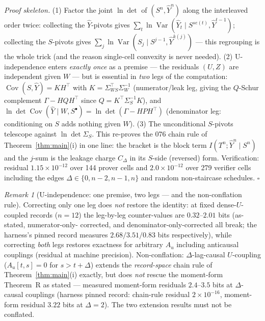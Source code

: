 \documentclass[11pt]{article}
\theoremstyle{definition}
\theoremstyle{remark}
\newtheorem{remark}{Remark}
\begin{document}
\noindent\emph{Proof skeleton.} (1) Factor the joint
$\ln\det$ of $(S^n,\hat Y^n)$ along the interleaved order twice:
collecting the $\hat Y$-pivots gives $\sum_t\ln\operatorname{Var}
(\hat Y_t\mid S^{se(t)},\hat Y^{t-1})$; collecting the $S$-pivots
gives $\sum_j\ln\operatorname{Var}(S_j\mid S^{j-1},\hat Y^{k(j)})$
--- this regrouping is the whole trick (and the reason single-cell
convexity is never needed). (2) U-independence enters \emph{exactly
once} as a premise --- the residuals $(U,Z)$ are independent given
$W$ --- but is essential in \emph{two} legs of the computation:
$\operatorname{Cov}(S,\hat Y)=KH^{\!\top}$ with
$K=\Sigma_{WS}^{\!\top}\Sigma_W^{-1}$ (numerator/leak leg, giving the
$Q$-Schur complement $\Gamma-HQH^{\!\top}$ since
$Q=K^{\!\top}\Sigma_S^{-1}K$), and
$\ln\det\operatorname{Cov}(\hat Y\mid W,S^{\bullet})
=\ln\det(\Gamma-HPH^{\!\top})$ (denominator leg: conditioning on $S$
adds nothing given $W$). (3) The unconditional $S$-pivots telescope
against $\ln\det\Sigma_S$. This re-proves the 076 chain rule of
Theorem~\ref{thm:main}(i) in one line: the bracket is the block
term $I(T^n;\hat Y^n\mid S^n)$ and the $j$-sum is the leakage charge
$C_\Delta$ in its $S$-side (reversed) form. Verification: residual
$1.15\times10^{-12}$ over 144 prover cells and $2.0\times10^{-12}$
over 279 verifier cells including the edges
$\Delta\in\{0,n-2,n-1,n\}$ and random non-staircase schedules.\hfill
$\square$

\begin{remark}[U-independence: one premise, two legs --- and the
non-conflation rule]
\label{rem:ulegs}
Correcting only one leg does \emph{not} restore the identity: at
fixed dense-$U$-coupled records ($n=12$) the leg-by-leg
counter-values are $0.32$--$2.01$ bits (as-stated, numerator-only-
corrected, and denominator-only-corrected all break; the harness's
pinned record measures $2.68/3.51/0.83$ bits respectively), while
correcting \emph{both} legs restores exactness for arbitrary $A_u$
including anticausal couplings (residual at machine precision).
Non-conflation: $\Delta$-lag-causal $U$-coupling
($A_u[t,s]=0$ for $s>t+\Delta$) extends the \emph{record-space}
chain rule of Theorem~\ref{thm:main}(i) exactly, but does
\emph{not} rescue the moment-form Theorem~R as stated --- measured
moment-form residuals $2.4$--$3.5$ bits at $\Delta$-causal
couplings (harness pinned record: chain-rule residual
$2\times10^{-16}$, moment-form residual $3.22$ bits at $\Delta=2$).
The two extension results must not be conflated.
\end{remark}
\end{document}
